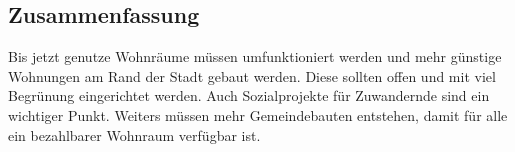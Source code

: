 \subsection{Zusammenfassung}

Bis jetzt genutze Wohnräume müssen umfunktioniert werden und mehr günstige Wohnungen am Rand der Stadt gebaut werden. Diese sollten offen und mit viel Begrünung eingerichtet werden. Auch Sozialprojekte für Zuwandernde sind ein wichtiger Punkt. Weiters müssen mehr Gemeindebauten entstehen, damit für alle ein bezahlbarer Wohnraum verfügbar ist.